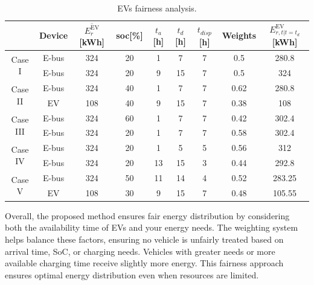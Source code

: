 \documentclass[preprint, 12pt, 3p]{elsarticle}
\begin{document}
\begin{table}[t!]
    \caption{EVs fairness analysis.}
    \label{tab:fairness_analysis}
    \vspace{-15pt}
    \begin{center}
        \begin{threeparttable}
            \begin{tabular}{ccccccccc}
            \hline
                &Device & $\overline{{E}^{\text{EV}}_{r}}$ [kWh]& \gls{soc}[\%] 
                    & $t_{a}$ [h]& $t_{d}$[h] & $t_{disp}$[h] & Weights 
                    & $E^{\text{EV}}_{r,t|t={t_{d}}}$ [kWh] \\
            \hline
                \multirow{2}{*}{Case I}
                & E-bus&324&20& 1 & 7 & 7 & 0.5 & 280.8\\
                & E-bus&324&20& 9 & 15 & 7 & 0.5 & 324\\
            \hline
                \multirow{2}{*}{Case II}
                & E-bus&324&40& 1 & 7 & 7 & 0.62 & 280.8\\
                & EV&108&40& 9 & 15 & 7 & 0.38 & 108\\
            \hline
                \multirow{2}{*}{Case III}
                & E-bus&324&60& 1 & 7 & 7 & 0.42 & 302.4\\
                & E-bus&324&20& 1 & 7 & 7 & 0.58 & 302.4\\
            \hline
                \multirow{2}{*}{Case IV}
                & E-bus&324&20& 1 & 5 & 5 & 0.56  & 312\\
                & E-bus&324&20& 13 & 15 & 3 & 0.44 &292.8\\
            \hline
                \multirow{2}{*}{Case V}
                & E-bus&324&50& 11 & 14 & 4 & 0.52 & 283.25\\
                & EV&108&30& 9 & 15 & 7 &  0.48& 105.55\\
            \hline
            \end{tabular}
        \end{threeparttable}
    \end{center}
\end{table}

Overall, the proposed method ensures fair energy distribution by considering both the availability time of EVs and your energy needs.
The weighting system helps balance these factors, ensuring no vehicle is unfairly treated based
on arrival time, SoC, or charging needs. Vehicles with greater needs or more
available charging time receive slightly more energy. This fairness approach ensures optimal 
energy distribution even when resources are limited.
\end{document}
